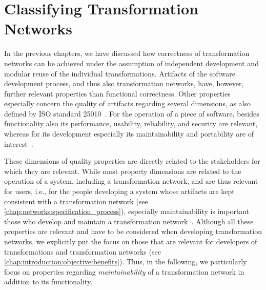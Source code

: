 \chapter{Classifying Transformation Networks
}
\label{chap:classification}

In the previous chapters, we have discussed how correctness of transformation networks can be achieved under the assumption of independent development and modular reuse of the individual transformations.
Artifacts of the software development process, and thus also transformation networks, have, however, further relevant properties than functional correctness.
Other properties especially concern the quality of artifacts regarding several dimensions, as also defined by ISO standard 25010~\cite{iso25010}.
For the operation of a piece of software, besides functionality also its performance, usability, reliability, and security are relevant, whereas for its development especially its maintainability and portability are of interest~\cite[Tab. 2]{iso25010}.

These dimensions of quality properties are directly related to the stakeholders for which they are relevant.
While most property dimensions are related to the operation of a system, including a transformation network, and are thus relevant for users, i.e., for the people developing a system whose artifacts are kept consistent with a transformation network (see \autoref{chap:networks:specification_process}), especially maintainability is important those who develop and maintain a transformation network~\cite[Tab. 2]{iso25010}.
Although all these properties are relevant and have to be considered when developing transformation networks, we explicitly put the focus on those that are relevant for developers of transformations and transformation networks (see \autoref{chap:introduction:objective:benefits}).
Thus, in the following, we particularly focus on properties regarding \emph{maintainability} of a transformation network in addition to its functionality.

